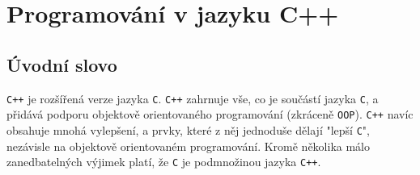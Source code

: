 {
\chapter{Programování v jazyku C++}
\minitoc

  \section{Úvodní slovo}
    \texttt{C++} je rozšířená verze jazyka \texttt{C}. \texttt{C++} zahrnuje vše, co je součástí 
    jazyka \texttt{C}, a přidává podporu objektově orientovaného programování (zkráceně 
    \texttt{OOP}). \texttt{C++} navíc obsahuje mnohá vylepšení, a prvky, které z něj jednoduše 
    dělají "lepší \texttt{C}", nezávisle na objektově orientovaném programování. Kromě několika 
    málo zanedbatelných výjimek platí, že \texttt{C} je podmnožinou jazyka \texttt{C++}.
  
}
